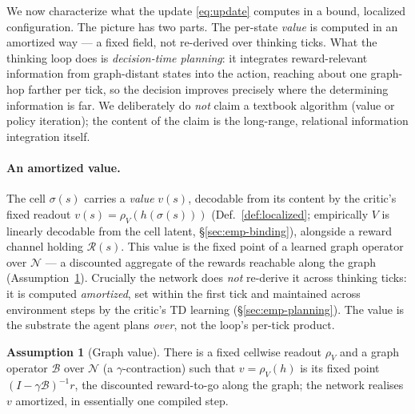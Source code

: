 \documentclass{article} %
\theoremstyle{plain}
\theoremstyle{definition}
\newtheorem{assumption}{Assumption}[section]
\begin{document}
We now characterize what the update \eqref{eq:update} computes in a bound,
localized configuration. The picture has two parts. The per-state \emph{value} is
computed in an amortized way --- a fixed field, not re-derived over thinking ticks.
What the thinking loop does is \emph{decision-time planning}: it integrates
reward-relevant information from graph-distant states into the action, reaching
about one graph-hop farther per tick, so the decision improves precisely where the
determining information is far. We deliberately do \emph{not} claim a textbook
algorithm (value or policy iteration); the content of the claim is the long-range,
relational information integration itself.

\paragraph{An amortized value.} The cell $\sigma(s)$ carries a \emph{value} $v(s)$,
decodable from its content by the critic's fixed readout
$v(s)=\rho_V(h(\sigma(s)))$ (Def.~\ref{def:localized}; empirically $V$ is linearly
decodable from the cell latent, \S\ref{sec:emp-binding}), alongside a reward channel
holding $\mathcal R(s)$. This value is the fixed point of a learned graph operator
over $\mathcal N$ --- a discounted aggregate of the rewards reachable along the
graph (Assumption~\ref{ass:value}). Crucially the network does \emph{not} re-derive
it across thinking ticks: it is computed \emph{amortized}, set within the first
tick and maintained across environment steps by the critic's TD learning
(\S\ref{sec:emp-planning}). The value is the substrate the agent plans \emph{over},
not the loop's per-tick product.

\begin{assumption}[Graph value]
\label{ass:value}
There is a fixed cellwise readout $\rho_V$ and a graph operator $\mathcal B$ over
$\mathcal N$ (a $\gamma$-contraction) such that $v=\rho_V(h)$ is its fixed point
$(I-\gamma\mathcal B)^{-1}r$, the discounted reward-to-go along the graph; the
network realises $v$ amortized, in essentially one compiled step.
\end{assumption}
\end{document}

